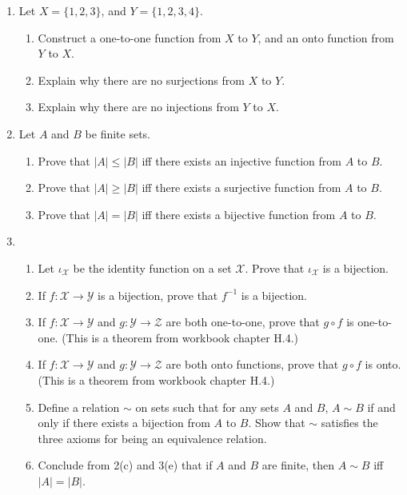 \documentclass[a4paper,12pt]{article}
\newcommand{\X}{\mathcal{X}}
\newcommand{\Y}{\mathcal{Y}}
\newcommand{\calZ}{\mathcal{Z}}
\begin{document}
\begin{enumerate}
\item Let $X = \{1, 2, 3\}$, and $Y = \{1, 2, 3, 4\}$.
\begin{enumerate}
\item Construct a one-to-one function from $X$ to $Y$, and an onto function
from $Y$ to $X$.
\item Explain why there are no surjections from $X$ to $Y$.
\item Explain why there are no injections from $Y$ to $X$.
\end{enumerate}

\item Let $A$ and $B$ be finite sets.
\begin{enumerate}
\item Prove that $|A| \leq |B|$ iff there exists an injective
function from $A$ to $B$.
\item Prove that $|A| \geq |B|$ iff there exists a surjective
function from $A$ to $B$.
\item Prove that $|A| = |B|$ iff there exists a bijective
function from $A$ to $B$.
\end{enumerate}

\item
\begin{enumerate}
\item Let $\iota_\X$ be the identity function on a set $\X$. Prove that
$\iota_\X$ is a bijection.
\item If $f : \X \to \Y$ is a bijection, prove that $f^{-1}$ is a bijection.
\item If $f : \X \to \Y$ and $g : \Y \to \calZ$ are both one-to-one,
prove that $g \circ f$ is one-to-one. (This is a theorem from workbook chapter H.4.)
\item If $f : \X \to \Y$ and $g : \Y \to \calZ$ are both onto functions,
prove that $g \circ f$ is onto. (This is a theorem from workbook chapter H.4.)
\item Define a relation $\sim$ on sets such that for any sets $A$ and $B$,
$A \sim B$ if and only if there exists a bijection from $A$ to $B$. Show that
$\sim$ satisfies the three axioms for being an equivalence relation.
\item Conclude from 2(c) and 3(e)
that if $A$ and $B$ are finite, then $A \sim B$ iff $|A|=|B|$.
\end{enumerate}


\end{enumerate}
\end{document}
